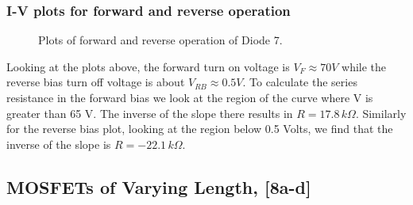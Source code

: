 \documentclass{article}
\begin{document}
\subsubsection{I-V plots for forward and reverse operation}
\begin{figure}[H]
\centering
{}
\caption{Plots of forward and reverse operation of Diode 7.}
\end{figure}

Looking at the plots above, the forward turn on voltage is $V_F \approx 70 V$ while the reverse bias turn off voltage is about $V_{RB} \approx 0.5 V$. To calculate the series resistance in the forward bias we look at the region of the curve where V is greater than 65 V. The inverse of the slope there results in $R = 17.8 \,k\Omega$. Similarly for the reverse bias plot, looking at the region below 0.5 Volts, we find that the inverse of the slope is $R = -22.1\,k\Omega$.



\subsection{MOSFETs of Varying Length, [8a-d]} %
\end{document}
